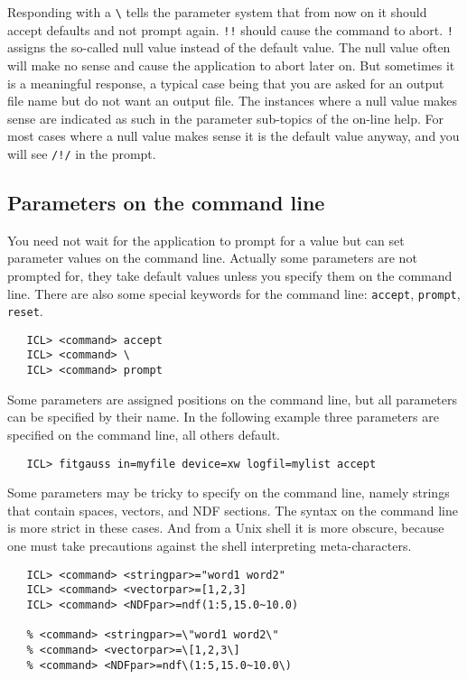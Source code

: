    Responding with a \verb+\+ tells the parameter system that from now
   on it should accept defaults and not prompt again.
   {\tt !!} should cause the command to abort. {\tt !} assigns the
   so-called null value instead of the default value. The null value
   often will make no sense and cause the application to abort later
   on. But sometimes it is a meaningful response, a typical case being
   that you are asked for an output file name but do not want an output
   file. The instances where a null value makes sense are indicated as
   such in the parameter sub-topics of the on-line help. For most cases
   where a null value makes sense it is the default value anyway, and
   you will see {\tt /!/} in the prompt.


\subsection{Parameters on the command line}

   You need not wait for the application to prompt for a value but can
   set parameter values on the command line. Actually some parameters
   are not prompted for, they take default values unless you specify
   them on the command line. There are also some special keywords for
   the command line: {\tt accept}, {\tt prompt}, {\tt reset}.

\begin{verbatim}
   ICL> <command> accept
   ICL> <command> \
   ICL> <command> prompt
\end{verbatim}

   Some parameters are assigned positions on the command line, but all
   parameters can be specified by their name. In the following example
   three parameters are specified on the command line, all others
   default.

\begin{verbatim}
   ICL> fitgauss in=myfile device=xw logfil=mylist accept
\end{verbatim}

   Some parameters may be tricky to specify on the command line, namely
   strings that contain spaces, vectors, and NDF sections. The syntax on
   the command line is more strict in these cases. And from a Unix shell
   it is more obscure, because one must take precautions against the
   shell interpreting meta-characters.

\begin{verbatim}
   ICL> <command> <stringpar>="word1 word2"
   ICL> <command> <vectorpar>=[1,2,3]
   ICL> <command> <NDFpar>=ndf(1:5,15.0~10.0)

   % <command> <stringpar>=\"word1 word2\"
   % <command> <vectorpar>=\[1,2,3\]
   % <command> <NDFpar>=ndf\(1:5,15.0~10.0\)
\end{verbatim}

